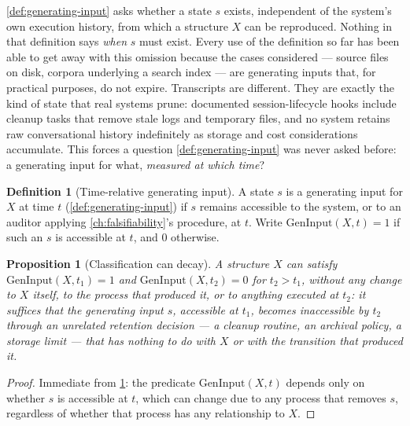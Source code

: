 \documentclass[11pt]{book}
\theoremstyle{plain}
\newtheorem{proposition}[theorem]{Proposition}
\theoremstyle{definition}
\newtheorem{definition}[theorem]{Definition}
\theoremstyle{remark}
\begin{document}
\cref{def:generating-input} asks whether a state $s$ exists,
independent of the system's own execution history, from which a
structure $X$ can be reproduced. Nothing in that definition says
\emph{when} $s$ must exist. Every use of the definition so far has
been able to get away with this omission because the cases considered
--- source files on disk, corpora underlying a search index --- are
generating inputs that, for practical purposes, do not expire.
Transcripts are different. They are exactly the kind of state that
real systems prune: documented session-lifecycle hooks include cleanup
tasks that remove stale logs and temporary files, and no system
retains raw conversational history indefinitely as storage and cost
considerations accumulate. This forces a question
\cref{def:generating-input} was never asked before: a generating input
for what, \emph{measured at which time}?

\begin{definition}[Time-relative generating input]
\label{def:time-relative-generating-input}
A state $s$ is a generating input for $X$ at time $t$
(\cref{def:generating-input}) if $s$ remains accessible to the system,
or to an auditor applying \cref{ch:falsifiability}'s procedure, at $t$.
Write $\mathrm{GenInput}(X, t) = 1$ if such an $s$ is accessible at
$t$, and $0$ otherwise.
\end{definition}

\begin{proposition}[Classification can decay]
\label{prop:classification-decay}
A structure $X$ can satisfy $\mathrm{GenInput}(X, t_1) = 1$ and
$\mathrm{GenInput}(X, t_2) = 0$ for $t_2 > t_1$, without any change to
$X$ itself, to the process that produced it, or to anything executed
at $t_2$: it suffices that the generating input $s$, accessible at
$t_1$, becomes inaccessible by $t_2$ through an unrelated retention
decision --- a cleanup routine, an archival policy, a storage limit
--- that has nothing to do with $X$ or with the transition that
produced it.
\end{proposition}

\begin{proof}
Immediate from \cref{def:time-relative-generating-input}: the
predicate $\mathrm{GenInput}(X, t)$ depends only on whether $s$ is
accessible at $t$, which can change due to any process that removes
$s$, regardless of whether that process has any relationship to $X$.
\end{proof}
\end{document}
